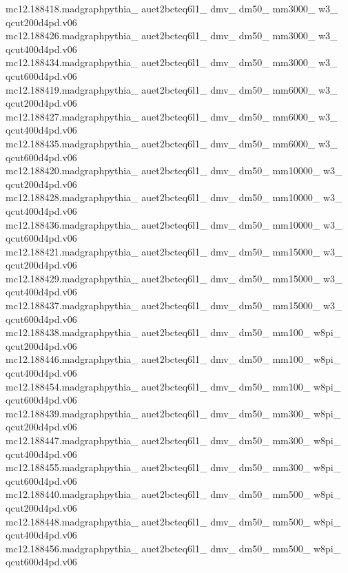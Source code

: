 mc12.188418.madgraphpythia\_ auet2bcteq6l1\_ dmv\_ dm50\_ mm3000\_ w3\_ qcut200d4pd.v06\\
mc12.188426.madgraphpythia\_ auet2bcteq6l1\_ dmv\_ dm50\_ mm3000\_ w3\_ qcut400d4pd.v06\\
mc12.188434.madgraphpythia\_ auet2bcteq6l1\_ dmv\_ dm50\_ mm3000\_ w3\_ qcut600d4pd.v06\\

mc12.188419.madgraphpythia\_ auet2bcteq6l1\_ dmv\_ dm50\_ mm6000\_ w3\_ qcut200d4pd.v06\\
mc12.188427.madgraphpythia\_ auet2bcteq6l1\_ dmv\_ dm50\_ mm6000\_ w3\_ qcut400d4pd.v06\\
mc12.188435.madgraphpythia\_ auet2bcteq6l1\_ dmv\_ dm50\_ mm6000\_ w3\_ qcut600d4pd.v06\\

mc12.188420.madgraphpythia\_ auet2bcteq6l1\_ dmv\_ dm50\_ mm10000\_ w3\_ qcut200d4pd.v06\\
mc12.188428.madgraphpythia\_ auet2bcteq6l1\_ dmv\_ dm50\_ mm10000\_ w3\_ qcut400d4pd.v06\\
mc12.188436.madgraphpythia\_ auet2bcteq6l1\_ dmv\_ dm50\_ mm10000\_ w3\_ qcut600d4pd.v06\\

mc12.188421.madgraphpythia\_ auet2bcteq6l1\_ dmv\_ dm50\_ mm15000\_ w3\_ qcut200d4pd.v06\\
mc12.188429.madgraphpythia\_ auet2bcteq6l1\_ dmv\_ dm50\_ mm15000\_ w3\_ qcut400d4pd.v06\\
mc12.188437.madgraphpythia\_ auet2bcteq6l1\_ dmv\_ dm50\_ mm15000\_ w3\_ qcut600d4pd.v06\\

mc12.188438.madgraphpythia\_ auet2bcteq6l1\_ dmv\_ dm50\_ mm100\_ w8pi\_ qcut200d4pd.v06\\
mc12.188446.madgraphpythia\_ auet2bcteq6l1\_ dmv\_ dm50\_ mm100\_ w8pi\_ qcut400d4pd.v06\\
mc12.188454.madgraphpythia\_ auet2bcteq6l1\_ dmv\_ dm50\_ mm100\_ w8pi\_ qcut600d4pd.v06\\

mc12.188439.madgraphpythia\_ auet2bcteq6l1\_ dmv\_ dm50\_ mm300\_ w8pi\_ qcut200d4pd.v06\\
mc12.188447.madgraphpythia\_ auet2bcteq6l1\_ dmv\_ dm50\_ mm300\_ w8pi\_ qcut400d4pd.v06\\
mc12.188455.madgraphpythia\_ auet2bcteq6l1\_ dmv\_ dm50\_ mm300\_ w8pi\_ qcut600d4pd.v06\\

mc12.188440.madgraphpythia\_ auet2bcteq6l1\_ dmv\_ dm50\_ mm500\_ w8pi\_ qcut200d4pd.v06\\
mc12.188448.madgraphpythia\_ auet2bcteq6l1\_ dmv\_ dm50\_ mm500\_ w8pi\_ qcut400d4pd.v06\\
mc12.188456.madgraphpythia\_ auet2bcteq6l1\_ dmv\_ dm50\_ mm500\_ w8pi\_ qcut600d4pd.v06\\

